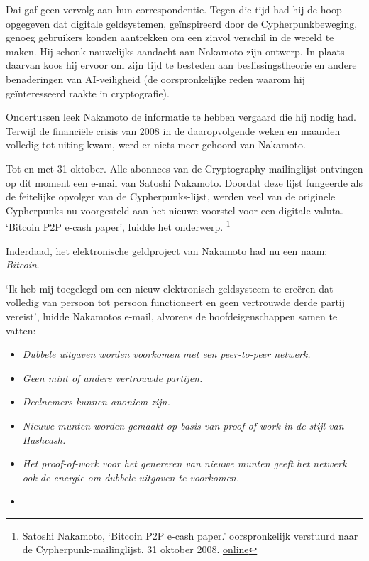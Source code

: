 \documentclass[
  a5paper,
  smalldemyvopaper,11pt,twoside,onecolumn,openright,extrafontsizes]{memoir}
\begin{document}
Dai gaf geen vervolg aan hun correspondentie. Tegen die tijd had hij de
hoop opgegeven dat digitale geldsystemen, geïnspireerd door de
Cypherpunkbeweging, genoeg gebruikers konden aantrekken om een zinvol
verschil in de wereld te maken. Hij schonk nauwelijks aandacht aan
Nakamoto zijn ontwerp. In plaats daarvan koos hij ervoor om zijn tijd te
besteden aan beslissingstheorie en andere benaderingen van AI-veiligheid
(de oorspronkelijke reden waarom hij geïnteresseerd raakte in
cryptografie).

Ondertussen leek Nakamoto de informatie te hebben vergaard die hij nodig
had. Terwijl de financiële crisis van 2008 in de daaropvolgende weken en
maanden volledig tot uiting kwam, werd er niets meer gehoord van
Nakamoto.

Tot en met 31 oktober. Alle abonnees van de Cryptography-mailinglijst
ontvingen op dit moment een e-mail van Satoshi Nakamoto. Doordat deze
lijst fungeerde als de feitelijke opvolger van de Cypherpunks-lijst,
werden veel van de originele Cypherpunks nu voorgesteld aan het nieuwe
voorstel voor een digitale valuta. `Bitcoin P2P e-cash paper', luidde
het onderwerp. \footnote{Satoshi Nakamoto, `Bitcoin P2P e-cash paper.'
  oorspronkelijk verstuurd naar de Cypherpunk-mailinglijst. 31 oktober
  2008.
  \href{https://www.metzdowd.com/pipermail/cryptography/2008-October/014810.html}{online}}

Inderdaad, het elektronische geldproject van Nakamoto had nu een naam:
\emph{Bitcoin}.

`Ik heb mij toegelegd om een nieuw elektronisch geldsysteem te creëren
dat volledig van persoon tot persoon functioneert en geen vertrouwde
derde partij vereist', luidde Nakamotos e-mail, alvorens de
hoofdeigenschappen samen te vatten:

\begin{itemize}
\item
  \emph{Dubbele uitgaven worden voorkomen met een peer-to-peer netwerk.}
\item
  \emph{Geen mint of andere vertrouwde partijen.}
\item
  \emph{Deelnemers kunnen anoniem zijn.}
\item
  \emph{Nieuwe munten worden gemaakt op basis van proof-of-work in de
  stijl van Hashcash.}
\item
  \emph{Het proof-of-work voor het genereren van nieuwe munten geeft het
  netwerk ook de energie om dubbele uitgaven te voorkomen.}
\item
\end{itemize}
\end{document}
